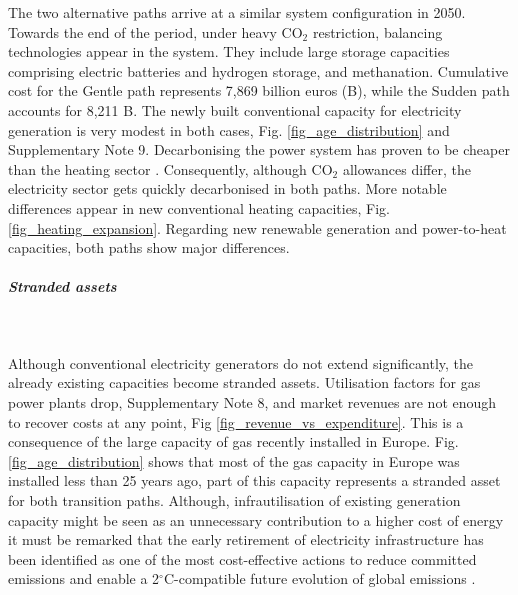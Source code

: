 \documentclass[5p]{elsarticle} %
\begin{document}
The two alternative paths arrive at a similar system configuration in 2050. Towards the end of the period, under heavy CO$_2$ restriction, balancing technologies appear in the system. They include large storage capacities comprising electric batteries and hydrogen storage, and methanation.  \textcolor[rgb]{1,0,0}{Cumulative cost for the Gentle path represents 7,869 billion euros (B\EUR), while the Sudden path accounts for 8,211 B\EUR.} The newly built conventional capacity for electricity generation is very modest in both cases, Fig. \ref{fig_age_distribution} and Supplementary Note 9. Decarbonising the power system has proven to be cheaper than the heating sector \cite{Zhu_2019}. Consequently, although CO$_2$ allowances differ, the electricity sector gets quickly decarbonised in both paths. \textcolor[rgb]{1,0,0}{More notable differences appear in new conventional heating capacities, Fig. \ref{fig_heating_expansion}. Regarding new renewable generation and power-to-heat capacities, both paths show major differences.}

\subparagraph{\textbf{Stranded assets}} \

\textcolor[rgb]{1,0,0}{Although conventional electricity generators do not extend significantly, the already existing capacities become stranded assets. Utilisation factors for gas power plants drop, Supplementary Note 8, and market revenues are not enough to recover costs at any point, Fig \ref{fig_revenue_vs_expenditure}. This is a consequence of the large capacity of gas recently installed in Europe. Fig. \ref{fig_age_distribution} shows that most of the gas capacity in Europe was installed less than 25 years ago, part of this capacity represents a stranded asset for both transition paths. Although, infrautilisation of existing generation capacity might be seen as an unnecessary contribution to a higher cost of energy it must be remarked that the early retirement of electricity infrastructure has been identified as one of the most cost-effective actions to reduce committed emissions and enable a 2$^{\circ}$C-compatible future evolution of global emissions \cite{Tong_2019}.}

\end{document}
